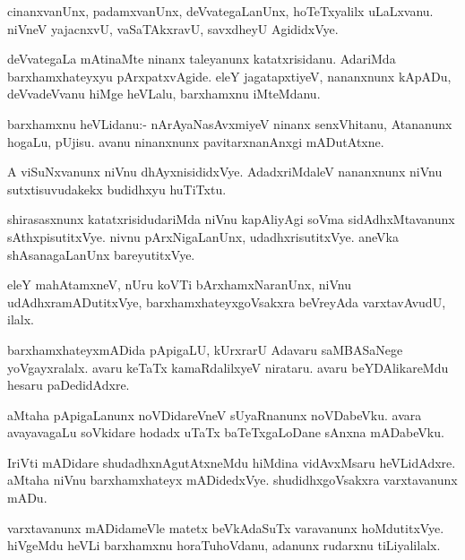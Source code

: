\documentclass{article}
\begin{document}
\begin{mn}%
cinanxvanUnx, padamxvanUnx, deVvategaLanUnx, hoTeTxyalilx
uLaLxvanu. niVneV yajacnxvU, vaSaTAkxravU, savxdheyU AgididxVye.
\end{mn}

\begin{mn}
deVvategaLa mAtinaMte ninanx taleyanunx katatxrisidanu. AdariMda
barxhamxhateyxyu pArxpatxvAgide. eleY jagatapxtiyeV, nananxnunx
kApADu, deVvadeVvanu hiMge heVLalu, barxhamxnu iMteMdanu.
\end{mn}

\begin{mn}%
barxhamxnu heVLidanu:- nArAyaNasAvxmiyeV ninanx senxVhitanu, Atananunx
hogaLu, pUjisu. avanu ninanxnunx pavitarxnanAnxgi mADutAtxne.
\end{mn}

\begin{mn}
A viSuNxvanunx niVnu dhAyxnisididxVye. AdadxriMdaleV nananxnunx niVnu
sutxtisuvudakekx budidhxyu huTiTxtu.
\end{mn}

\begin{mn}
shirasasxnunx katatxrisidudariMda niVnu kapAliyAgi soVma
sidAdhxMtavanunx sAthxpisutitxVye. nivnu pArxNigaLanUnx,
udadhxrisutitxVye. aneVka shAsanagaLanUnx bareyutitxVye.
\end{mn}

\begin{mn}%
eleY mahAtamxneV, nUru koVTi bArxhamxNaranUnx, niVnu
udAdhxramADutitxVye, barxhamxhateyxgoVsakxra beVreyAda varxtavAvudU, ilalx.
\end{mn}

\begin{mn}
barxhamxhateyxmADida pApigaLU, kUrxrarU Adavaru saMBASaNege
yoVgayxralalx. avaru keTaTx kamaRdalilxyeV nirataru. avaru
beYDAlikareMdu hesaru paDedidAdxre.
\end{mn}

\begin{mn}
aMtaha pApigaLanunx noVDidareVneV sUyaRnanunx noVDabeVku. avara
avayavagaLu soVkidare hodadx uTaTx baTeTxgaLoDane sAnxna mADabeVku.
\end{mn}

\begin{mn}
IriVti mADidare shudadhxnAgutAtxneMdu hiMdina vidAvxMsaru
heVLidAdxre. aMtaha niVnu barxhamxhateyx
mADidedxVye. shudidhxgoVsakxra varxtavanunx mADu.
\end{mn}

\begin{mn}
varxtavanunx mADidameVle matetx beVkAdaSuTx varavanunx
hoMdutitxVye. hiVgeMdu heVLi barxhamxnu horaTuhoVdanu, adanunx
rudarxnu tiLiyalilalx.
\end{mn}
\end{document}
